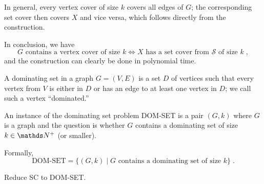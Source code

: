 \documentclass{exercise}
\begin{document}
\begin{solution}
    In general, every vertex cover of size $k$ covers all edges of $G$;
    the corresponding set cover then covers $X$ and vice versa, which
    follows directly from the construction.
    
    In conclusion, we have
    \[ G \text{ contains a vertex cover of size } k \iff X \text{ has a set cover from } \mathcal{S} \text{ of size } k\;, \]
    and the construction can clearly be done in polynomial time.
  \end{solution}

\subtask A dominating set in a graph $G=(V,E)$ is a set $D$ of vertices such
  that every vertex from $V$ is either in $D$ or has an edge to at least
  one vertex in $D$; we call such a vertex ``dominated.\!''

  An instance of the dominating set problem DOM-SET is a pair $(G,k)$ where $G$
  is a graph and the question is whether $G$ contains a dominating set of size
  $k\in\nat^+$ (or smaller).

  Formally,
  \[ \text{DOM-SET} = \{(G,k) \mid G \text{ contains a dominating set of size } k\} \;. \]

  Reduce SC to DOM-SET.
\end{document}
